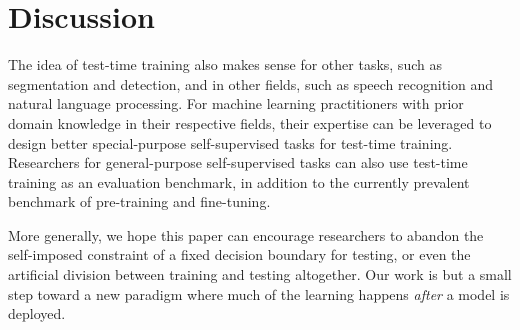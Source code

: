 \section{Discussion}
The idea of test-time training also makes sense for other tasks, such as segmentation and detection, and in other fields, such as speech recognition and natural language processing. 
For machine learning practitioners with prior domain knowledge in their respective fields, their expertise can be leveraged to design better special-purpose self-supervised tasks for test-time training.
Researchers for general-purpose self-supervised tasks can also use  test-time training as an evaluation benchmark, in addition to the currently prevalent benchmark of pre-training and fine-tuning.

More generally, we hope this paper can encourage researchers to abandon the self-imposed constraint of a fixed decision boundary for testing, or even the artificial division between training and testing altogether. 
Our work is but a small step toward a new paradigm where much of the learning happens {\em after} a model is deployed.
